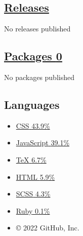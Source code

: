 \documentclass[
  english,
]{article}
\providecommand{\tightlist}{%
  \setlength{\itemsep}{0pt}\setlength{\parskip}{0pt}}
\begin{document}
\hypertarget{releases}{%
\subsection{\texorpdfstring{\href{/CptMike/online-cv/releases}{Releases}}{Releases}}\label{releases}}

No releases published

\hypertarget{packages-0}{%
\subsection{\texorpdfstring{\href{/users/CptMike/packages?repo_name=online-cv}{Packages
{0}}}{Packages 0}}\label{packages-0}}

No packages published\\

\hypertarget{languages}{%
\subsection{Languages}\label{languages}}

{ {} {} {} {} {} {} }

\begin{itemize}
\tightlist
\item
  \href{/CptMike/online-cv/search?l=css}{ {CSS} {43.9\%}}
\item
  \href{/CptMike/online-cv/search?l=javascript}{ {JavaScript} {39.1\%}}
\item
  \href{/CptMike/online-cv/search?l=tex}{ {TeX} {6.7\%}}
\item
  \href{/CptMike/online-cv/search?l=html}{ {HTML} {5.9\%}}
\item
  \href{/CptMike/online-cv/search?l=scss}{ {SCSS} {4.3\%}}
\item
  \href{/CptMike/online-cv/search?l=ruby}{ {Ruby} {0.1\%}}
\end{itemize}

\begin{itemize}
\tightlist
\item
  \href{https://github.com}{} { © 2022 GitHub, Inc. }
\end{itemize}
\end{document}
